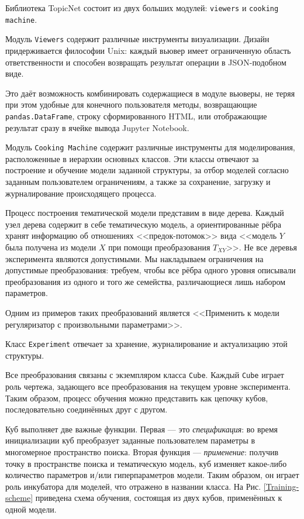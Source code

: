 Библиотека TopicNet состоит из двух больших модулей: \texttt{viewers} и \texttt{cooking machine}.  

Модуль \texttt{Viewers} содержит различные инструменты визуализации. Дизайн придерживается философии Unix: каждый вьювер имеет ограниченную область ответственности и способен возвращать результат операции в JSON-подобном виде.

Это даёт возможность комбинировать содержащиеся в модуле вьюверы, не теряя при этом удобные для конечного пользователя методы, возвращающие \texttt{pandas.DataFrame}, строку сформированного HTML, или отображающие результат сразу в ячейке вывода Jupyter Notebook. 

Модуль \texttt{Cooking Machine} содержит различные инструменты для моделирования, расположенные в иерархии основных классов. Эти классы отвечают за построение и обучение модели заданной структуры, за отбор моделей согласно заданным пользователем ограничениям, а также за сохранение, загрузку и журналирование происходящего процесса.

Процесс построения тематической модели представим в виде дерева. Каждый узел дерева содержит в себе тематическую модель, а ориентированные рёбра хранят информацию об отношениях <<предок-потомок>> вида <<модель $Y$ была получена из модели $X$ при помощи преобразования $T_{XY}$>>. Не все деревья эксперимента являются допустимыми. Мы накладываем ограничения на допустимые преобразования: требуем, чтобы все рёбра одного уровня описывали преобразования из одного и того же семейства, различающиеся лишь набором параметров. 

Одним из примеров таких преобразований является <<Применить к модели регуляризатор с произвольными параметрами>>. 

Класс \texttt{Experiment} отвечает за хранение, журналирование и актуализацию этой структуры.  

Все преобразования связаны с экземпляром класса \texttt{Cube}. Каждый \texttt{Cube} играет роль чертежа, задающего все преобразования на текущем уровне эксперимента. Таким образом, процесс обучения можно представить как цепочку кубов, последовательно соединённых друг с другом.  

Куб выполняет две важные функции. Первая --- это \textit{спецификация}: во время инициализации куб преобразует заданные пользователем параметры в многомерное пространство поиска. Вторая функция --- \textit{применение}: получив точку в пространстве поиска и тематическую модель, куб изменяет какое-либо количество параметров и/или гиперпараметров модели. Таким образом, он играет роль инкубатора для моделей, что отражено в названии класса. На Рис.  \ref{Training-scheme} приведена схема обучения, состоящая из двух кубов, применённых к одной модели.  

